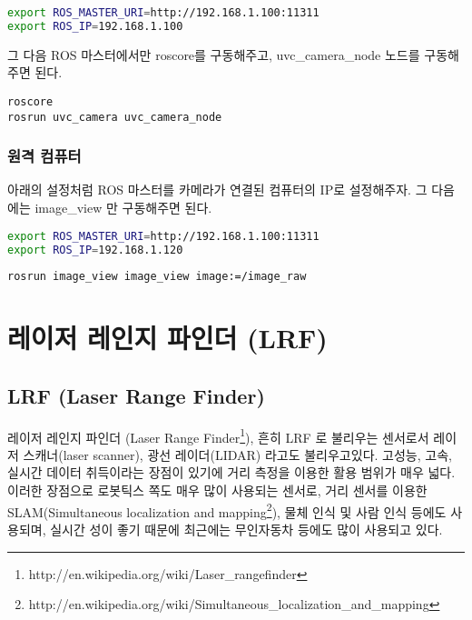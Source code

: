 \begin{lstlisting}[language=bash]
export ROS_MASTER_URI=http://192.168.1.100:11311 
export ROS_IP=192.168.1.100
\end{lstlisting}

그 다음 ROS 마스터에서만 roscore를 구동해주고, uvc\_camera\_node 노드를 구동해 주면 된다.

\begin{lstlisting}[language=ROS]
roscore
rosrun uvc_camera uvc_camera_node
\end{lstlisting}

\subsubsection{원격 컴퓨터}

아래의 설정처럼 ROS 마스터를 카메라가 연결된 컴퓨터의 IP로 설정해주자. 그 다음에는 image\_view 만 구동해주면 된다.

\begin{lstlisting}[language=bash]
export ROS_MASTER_URI=http://192.168.1.100:11311 
export ROS_IP=192.168.1.120
\end{lstlisting}

\begin{lstlisting}[language=ROS]
rosrun image_view image_view image:=/image_raw
\end{lstlisting}

\section{레이저 레인지 파인더 (LRF)}

\subsection{LRF (Laser Range Finder)}

레이저 레인지 파인더 (Laser Range Finder\footnote{http://en.wikipedia.org/wiki/Laser\_rangefinder}), 흔히 LRF 로 불리우는 센서로서 레이저 스캐너(laser scanner), 광선 레이더(LIDAR) 라고도 불리우고있다. 고성능, 고속, 실시간 데이터 취득이라는 장점이 있기에 거리 측정을 이용한 활용 범위가 매우 넓다. 이러한 장점으로 로봇틱스 쪽도 매우 많이 사용되는 센서로, 거리 센서를 이용한 SLAM(Simultaneous localization and mapping\footnote{http://en.wikipedia.org/wiki/Simultaneous\_localization\_and\_mapping}), 물체 인식 및 사람 인식 등에도 사용되며, 실시간 성이 좋기 때문에 최근에는 무인자동차 등에도 많이 사용되고 있다. 

